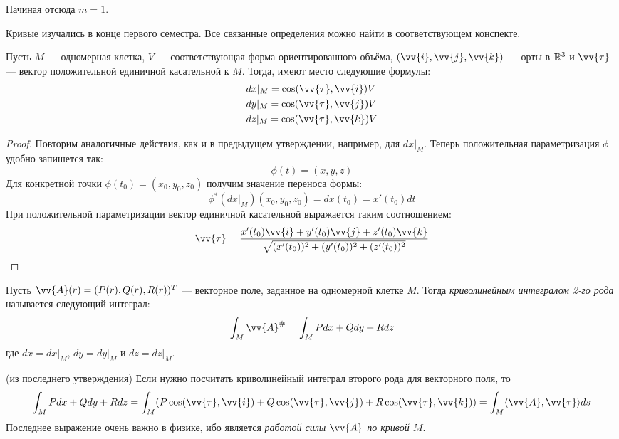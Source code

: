 \begin{note}
	Начиная отсюда $m = 1$.
\end{note}

\begin{reminder}
	Кривые изучались в конце первого семестра. Все связанные определения можно найти в соответствующем конспекте.
\end{reminder}

\begin{proposition}
	Пусть $M$ --- одномерная клетка, $V$ --- соответствующая форма ориентированного объёма, $(\vv{i}, \vv{j}, \vv{k})$ --- орты в $\mathbb{R}^3$ и $\vv{\tau}$ --- вектор положительной единичной касательной к $M$. Тогда, имеют место следующие формулы:
	\begin{align*}
		&{dx|_M = \cos(\vv{\tau}, \vv{i})V}
		\\
		&{dy|_M = \cos(\vv{\tau}, \vv{j})V}
		\\
		&{dz|_M = \cos(\vv{\tau}, \vv{k})V}
	\end{align*}
\end{proposition}

\begin{proof}
	Повторим аналогичные действия, как и в предыдущем утверждении, например, для $dx|_M$. Теперь положительная параметризация $\phi$ удобно запишется так:
	\[
		\phi(t) = (x, y, z)
	\]
	Для конкретной точки $\phi(t_0) = (x_0, y_0, z_0)$ получим значение переноса формы:
	\[
		\phi^*(dx|_M)(x_0, y_0, z_0) = dx(t_0) = x'(t_0)dt
	\]
	При положительной параметризации вектор единичной касательной выражается таким соотношением:
	\[
		\vv{\tau} = \frac{x'(t_0)\vv{i} + y'(t_0)\vv{j} + z'(t_0)\vv{k}}{\sqrt{(x'(t_0))^2 + (y'(t_0))^2 + (z'(t_0))^2}}
	\]
\end{proof}

\begin{definition}
	Пусть $\vv{A}(r) = (P(r), Q(r), R(r))^T$ --- векторное поле, заданное на одномерной клетке $M$. Тогда \textit{криволинейным интегралом 2-го рода} называется следующий интеграл:
	\[
		\int_M \vv{A}^\# = \int_M Pdx + Qdy + Rdz
	\]
	где $dx = dx|_M$, $dy = dy|_M$ и $dz = dz|_M$.
\end{definition}

\begin{corollary} (из последнего утверждения)
	Если нужно посчитать криволинейный интеграл второго рода для векторного поля, то
	\[
		\int_M Pdx + Qdy + Rdz = \int_M (P\cos(\vv{\tau}, \vv{i}) + Q\cos(\vv{\tau}, \vv{j}) + R\cos(\vv{\tau}, \vv{k})) = \int_M \ntbr{\vv{A}, \vv{\tau}}ds
	\]
	Последнее выражение очень важно в физике, ибо является \textit{работой силы $\vv{A}$ по кривой $M$}.
\end{corollary}

